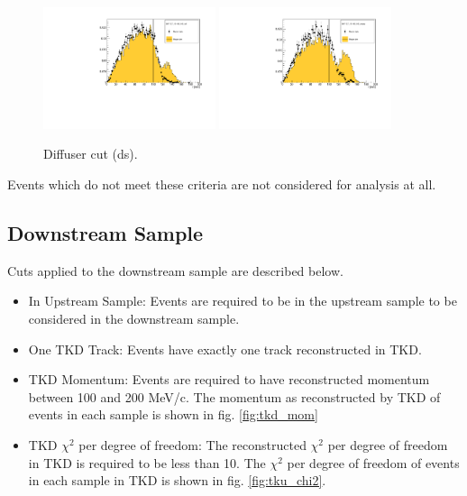 \begin{figure}[!tbh]
    \includegraphics*[width=0.45\textwidth]{02-Cuts/Figures/2017-2.7_10-140_lH2_full/global_through_virtual_diffuser_ds_r_us_cut.pdf}
    \includegraphics*[width=0.45\textwidth]{02-Cuts/Figures/2017-2.7_10-140_lH2_empty/global_through_virtual_diffuser_ds_r_us_cut.pdf}
    \caption{Diffuser cut (ds).
 \label{fig:diffuser_ds}}
\end{figure}

Events which do not meet these criteria are not considered for analysis at all.

\subsection{Downstream Sample}
Cuts applied to the downstream sample are described below.

\begin{itemize}
\item{In Upstream Sample:} Events are required to be in the upstream sample to
be considered in the downstream sample.
\item{One TKD Track:} Events have exactly one track reconstructed in TKD.
\item{TKD Momentum:} Events are required to have reconstructed momentum between 
100 and 200  MeV/c. The momentum as reconstructed by TKD of events in each 
sample is shown in fig. \ref{fig:tkd_mom}
\item{TKD $\chi^2$ per degree of freedom:} The reconstructed $\chi^2$ per degree of freedom in TKD is 
required to be less than 10. The $\chi^2$ per degree of freedom of events in 
each sample in TKD is shown in fig. \ref{fig:tku_chi2}.
\end{itemize}


